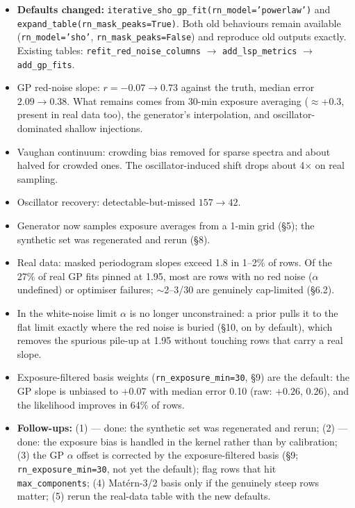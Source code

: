 \documentclass[11pt]{article}
\newcommand{\code}[1]{\texttt{#1}}
\begin{document}
\begin{itemize}
\item \textbf{Defaults changed:} \code{iterative\_sho\_gp\_fit(rn\_model='powerlaw')} and
  \code{expand\_table(rn\_mask\_peaks=True)}. Both old behaviours remain available
  (\code{rn\_model='sho'}, \code{rn\_mask\_peaks=False}) and reproduce old outputs
  exactly. Existing tables: \code{refit\_red\_noise\_columns} $\to$
  \code{add\_lsp\_metrics} $\to$ \code{add\_gp\_fits}.
\item GP red-noise slope: $r=-0.07 \to 0.73$ against the truth, median error $2.09\to0.38$.
  What remains comes from 30-min exposure averaging ($\approx$+0.3, present in real data
  too), the generator's interpolation, and oscillator-dominated shallow injections.
\item Vaughan continuum: crowding bias removed for sparse spectra and about halved for
  crowded ones. The oscillator-induced shift drops about 4$\times$ on real sampling.
\item Oscillator recovery: detectable-but-missed $157 \to 42$.
\item Generator now samples exposure averages from a 1-min grid (\S5); the synthetic set was
  regenerated and rerun (\S8).
\item Real data: masked periodogram slopes exceed 1.8 in 1--2\% of rows. Of the 27\% of
  real GP fits pinned at 1.95, most are rows with no red noise ($\alpha$ undefined) or
  optimiser failures; $\sim$2--3/30 are genuinely cap-limited (\S6.2).
\item In the white-noise limit $\alpha$ is no longer unconstrained: a prior pulls it to the
  flat limit exactly where the red noise is buried (\S10, on by default), which removes the
  spurious pile-up at 1.95 without touching rows that carry a real slope.
\item Exposure-filtered basis weights (\code{rn\_exposure\_min=30}, \S9) are the default:
  the GP slope is unbiased to $+0.07$ with median error 0.10 (raw: $+0.26$, 0.26), and the
  likelihood improves in 64\% of rows.
\item \textbf{Follow-ups:} (1) --- done: the synthetic set was regenerated and rerun;
  (2) --- done: the exposure bias is handled in the kernel rather than by calibration;
  (3) the GP $\alpha$ offset is corrected by the exposure-filtered basis (\S9;
  \code{rn\_exposure\_min=30}, not yet the default); flag rows that hit
  \code{max\_components};
  (4) Mat\'ern-3/2 basis only if the genuinely steep rows matter;
  (5) rerun the real-data table with the new defaults.
\end{itemize}
\end{document}
